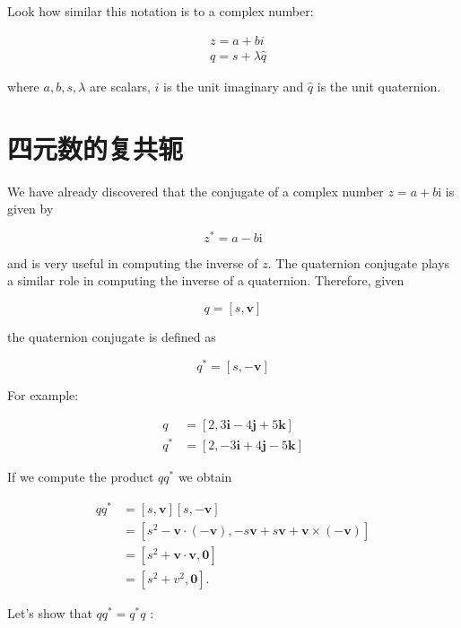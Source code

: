 Look how similar this notation is to a complex number:

$$
    \begin{aligned}
         & z=a+b i             \\
         & q=s+\lambda \hat{q}
    \end{aligned}
$$

where $a, b, s, \lambda$ are scalars, $i$ is the unit imaginary and $\hat{q}$ is the unit quaternion.

\section{四元数的复共轭}
We have already discovered that the conjugate of a complex number $z=a+b \mathrm{i}$ is given by

$$
    z^{*}=a-b \mathrm{i}
$$

and is very useful in computing the inverse of $z$. The quaternion conjugate plays a similar role in computing the inverse of a quaternion. Therefore, given

$$
    q=[s, \mathbf{v}]
$$

the quaternion conjugate is defined as

$$
    q^{*}=[s,-\mathbf{v}]
$$

For example:

$$
    \begin{aligned}
        q     & =[2,3 \mathbf{i}-4 \mathbf{j}+5 \mathbf{k}]  \\
        q^{*} & =[2,-3 \mathbf{i}+4 \mathbf{j}-5 \mathbf{k}]
    \end{aligned}
$$

If we compute the product $q q^{*}$ we obtain

$$
    \begin{aligned}
        q q^{*} & =[s, \mathbf{v}][s,-\mathbf{v}]                                                                             \\
                & =\left[s^{2}-\mathbf{v} \cdot(-\mathbf{v}),-s \mathbf{v}+s \mathbf{v}+\mathbf{v} \times(-\mathbf{v})\right] \\
                & =\left[s^{2}+\mathbf{v} \cdot \mathbf{v}, \mathbf{0}\right]                                                 \\
                & =\left[s^{2}+v^{2}, \mathbf{0}\right] .
    \end{aligned}
$$

Let's show that $q q^{*}=q^{*} q$ :

